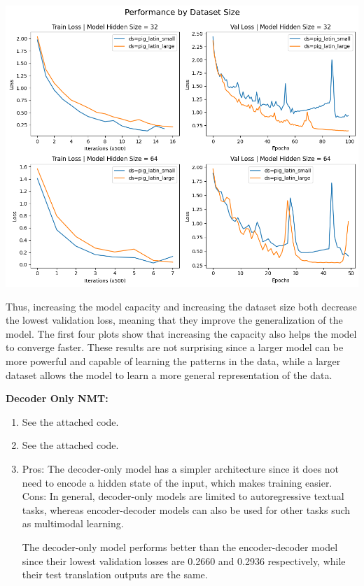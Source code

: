\documentclass[12pt]{article}
\begin{document}
\begin{enumerate}
\begin{center}
        \includegraphics[scale=.6]{2.1.4-2.png}
    \end{center} Thus, increasing the model capacity and increasing the dataset size both decrease the lowest validation loss, meaning that they improve the generalization of the model. The first four plots show that increasing the capacity also helps the model to converge faster. These results are not surprising since a larger model can be more powerful and capable of learning the patterns in the data, while a larger dataset allows the model to learn a more general representation of the data.
\end{enumerate}

\textbf{Decoder Only NMT:}
\begin{enumerate}
    \item See the attached code.
    \item See the attached code.
    \item Pros: The decoder-only model has a simpler architecture since it does not need to encode a hidden state of the input, which makes training easier. Cons: In general, decoder-only models are limited to autoregressive textual tasks, whereas encoder-decoder models can also be used for other tasks such as multimodal learning.
    
    The decoder-only model performs better than the encoder-decoder model since their lowest validation losses are 0.2660 and 0.2936 respectively, while their test translation outputs are the same.
\end{enumerate}
\end{document}
